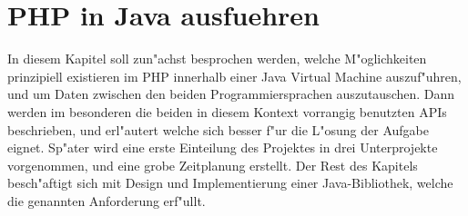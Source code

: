 \chapter{PHP in Java ausfuehren}
\label{sec:chap1}

In diesem Kapitel soll zun"achst besprochen werden, welche M"oglichkeiten prinzipiell existieren
im PHP innerhalb einer Java Virtual Machine auszuf"uhren, und um Daten zwischen den beiden
Programmiersprachen auszutauschen. Dann werden im besonderen die beiden in diesem Kontext
vorrangig benutzten APIs beschrieben, und erl"autert welche sich besser f"ur die L"osung der
Aufgabe eignet. Sp"ater wird eine erste Einteilung des Projektes in drei Unterprojekte vorgenommen,
und eine grobe Zeitplanung erstellt. Der Rest des Kapitels besch"aftigt sich mit Design und 
Implementierung einer Java-Bibliothek, welche die genannten Anforderung erf"ullt.







